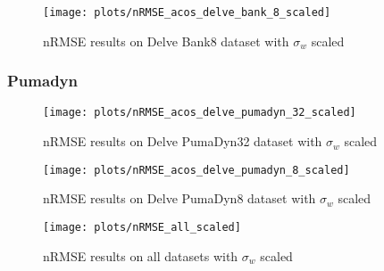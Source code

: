 \begin{figure}[H]
    \texttt{[image: plots/nRMSE\_acos\_delve\_bank\_8\_scaled]}
    \caption{nRMSE results on Delve Bank8 dataset with $\sigma_w$ scaled}
    \label{fig:nrmse-acos-delve-bank-8-scaled}
\end{figure}

\subsubsection{Pumadyn}

\begin{figure}[H]
    \texttt{[image: plots/nRMSE\_acos\_delve\_pumadyn\_32\_scaled]}
    \caption{nRMSE results on Delve PumaDyn32 dataset with $\sigma_w$ scaled}
    \label{fig:nrmse-acos-delve-pumadyn-32-scaled}
\end{figure}

\begin{figure}[H]
    \texttt{[image: plots/nRMSE\_acos\_delve\_pumadyn\_8\_scaled]}
    \caption{nRMSE results on Delve PumaDyn8 dataset with $\sigma_w$ scaled}
    \label{fig:nrmse-acos-delve-pumadyn-8-scaled}
\end{figure}

\begin{figure}[H]
    \texttt{[image: plots/nRMSE\_all\_scaled]}
    \caption{nRMSE results on all datasets with $\sigma_w$ scaled}
    \label{fig:nrmse-all-scaled}
\end{figure}


